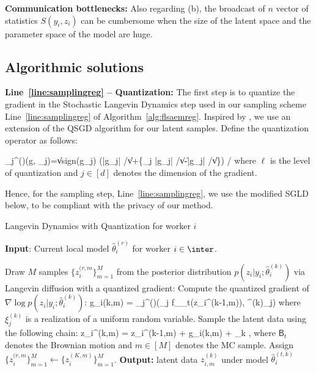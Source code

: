 \documentclass[11pt]{article}
\theoremstyle{t}
\begin{document}
\textbf{Communication bottlenecks:} Also regarding (b), the broadcast of $n$ vector of statistics $S(y_i,z_i)$ can be cumbersome when the size of the latent space and the parameter space of the model are huge.

\subsection{Algorithmic solutions}

\textbf{Line~\ref{line:samplingreg} -- Quantization:} 
The first step is to quantize the gradient in the Stochastic Langevin Dynamics step used in our sampling scheme Line~\ref{line:samplingreg} of Algorithm~\ref{alg:flsaemreg}.
Inspired by \citep{alistarh2017qsgd}, we use an extension of the QSGD algorithm for our latent samples.
Define the quantization operator as follows:

\beq\label{eq:operator}
_{j}^{(\ell)}\left(g, \xi_{j}\right)=\|v\| \cdot \textrm{sign}\left(g_{j}\right) \cdot\left(\left\lfloor \ell \left|g_{j}\right| /\|v\|\right\rfloor+\left\{\xi_{j} \leq \ell \left|g_{j}\right| /\|v\|-\left\lfloor \ell \left|g_{j}\right| /\|v\|\right\rfloor\right\}\right) /\ell
\eeq
where $\ell$ is the level of quantization and $j \in [d]$ denotes the dimension of the gradient.

Hence, for the sampling step, Line~\ref{line:samplingreg}, we use the modified SGLD below, to be compliant with the privacy of our method.
\begin{algorithm}[H]
\caption{Langevin Dynamics with Quantization for worker $i$} \label{alg:quant}
\begin{algorithmic}[1]
\STATE \textbf{Input}: Current local model $\hat{\theta}^{(r)}_i$ for worker $i \in \inter$.

\STATE Draw $M$ samples $\{ z_{i}^{(r,m} \}_{m=1}^M$ from the posterior distribution $p(z_i| y_i; \hat{\theta}^{(k)}_i)$ via Langevin diffusion with a quantized gradient:\label{line:langevin}
\STATE Compute the quantized gradient of $\nabla \log p(z_i| y_i; \hat{\theta}^{(k)}_i)$:
\beq\label{eq:grad}
g_i{(k,m)} = _{j}^{(\ell)}\left(\nabla_j f_{\theta_t}(z_i^{(k-1,m)}), \xi^{(k)}_{j}\right)
\eeq
where $\xi^{(k)}_{j}$ is a realization of a uniform random variable.
\STATE Sample the latent data using the following chain:
\beq\label{eq:lang}
z_i^{(k,m)} = z_i^{(k-1,m)} +   g_i{(k,m)} +   _k \eqsp,
\eeq
where $\mathsf{B}_t$ denotes the Brownian motion and $m \in [M]$ denotes the MC sample.
\ENDFOR
\STATE Assign $\{ z_{i}^{(r,m} \}_{m=1}^M \leftarrow \{ z_i^{(K,m)} \}_{m=1}^M$.
\STATE \textbf{Output:} latent data $z_{i,m}^{(k)}$ under model $\hat{\theta}^{(t,k)}_i$ 
\end{algorithmic}
\end{algorithm}
\end{document}
